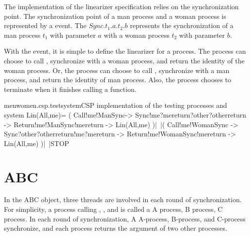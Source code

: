 \documentclass{article}
\begin{document}
The implementation of the linearizer specification relies on the synchronization point. The synchronization point of a man process and a woman process is represented by a  event. The $Sync.t_1.a.t_2.b$ represents the synchronization of a man process $t_1$ with parameter $a$ with a woman process $t_2$ with parameter $b$.

With the  event, it is simple to define the linearizer for a process. The process can choose to call , synchronize with a woman process, and return the identity of the woman process. Or, the process can choose to call , synchronize with a man process, and return the identity of man process. Also, the process chooses to terminate when it finishes calling a function.
\begin{cspinline}{menwomen.csp.testsystem}{CSP implementation of the testing processes and system}
Lin(All,me)= (
  Call!me!ManSync->
  Sync!me?mereturn?other?otherreturn ->
  Return!me!ManSync!mereturn ->
  Lin(All,me)
)|~|(
  Call!me!WomanSync ->
  Sync?other?otherreturn!me?mereturn ->
  Return!me!WomanSync!mereturn ->
  Lin(All,me)
)|~|STOP
\end{cspinline}

\section{ABC}
In the ABC object, three threads are involved in each round of synchronization. For simplicity, a process calling , , and  is called a A process, B process, C process. In each round of synchronization, A A-process, B-process, and C-process synchronize, and each process returns the argument of two other processes. 
\end{document}
